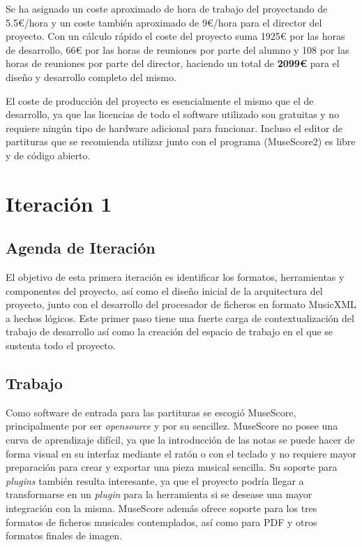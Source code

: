 Se ha asignado un coste aproximado de hora de trabajo del proyectando de 5.5\euro{}/hora y un coste también aproximado de 9\euro{}/hora para el director del proyecto. Con un cálculo rápido el coste del proyecto suma 1925\euro{} por las horas de desarrollo, 66\euro{} por las horas de reuniones por parte del alumno y 108 por las horas de reuniones por parte del director, haciendo un total de \textbf{2099\euro{}} para el diseño y desarrollo completo del mismo.

El coste de producción del proyecto es esencialmente el mismo que el de desarrollo, ya que las licencias de todo el software utilizado son gratuitas y no requiere ningún tipo de hardware adicional para funcionar. Incluso el editor de partituras que se recomienda utilizar junto con el programa (MuseScore2) es libre y de código abierto.

\section{Iteración 1}
\subsection{Agenda de Iteración}
El objetivo de esta primera iteración es identificar los formatos, herramientas y componentes del proyecto, así como el diseño inicial de la arquitectura del proyecto, junto con el desarrollo del procesador de ficheros en formato MusicXML a hechos lógicos. Este primer paso tiene una fuerte carga de contextualización del trabajo de desarrollo así como la creación del espacio de trabajo en el que se sustenta todo el proyecto.

\subsection{Trabajo}
Como software de entrada para las partituras se escogió MuseScore, principalmente por ser \textit{opensource} y por su sencillez. MuseScore no posee una curva de aprendizaje difícil, ya que la introducción de las notas se puede hacer de forma visual en su interfaz mediante el ratón o con el teclado y no requiere mayor preparación para crear y exportar una pieza musical sencilla. Su soporte para \textit{plugins} también resulta interesante, ya que el proyecto podría llegar a transformarse en un \textit{plugin} para la herramienta si se desease una mayor integración con la misma. MuseScore además ofrece soporte para los tres formatos de ficheros musicales contemplados, así como para PDF y otros formatos finales de imagen.

